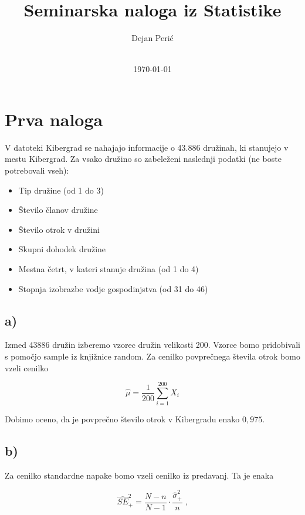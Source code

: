 \documentclass[12pt, a4paper]{article}
\title{Seminarska naloga iz Statistike}
\author{Dejan Perić \\~ \\ }
\date{\today}
\begin{document}

\maketitle




\section{Prva naloga}

V datoteki Kibergrad se nahajajo informacije o 43.886 družinah, 
ki stanujejo v mestu Kibergrad. Za vsako družino so zabeleženi 
naslednji podatki (ne boste potrebovali vseh):

\begin{itemize}
    \item Tip družine (od 1 do 3)
    \item Število članov družine
    \item Število otrok v družini
    \item Skupni dohodek družine
    \item Mestna četrt, v kateri stanuje družina (od 1 do 4)
    \item Stopnja izobrazbe vodje gospodinjstva (od 31 do 46)
\end{itemize}
    
\subsection{a)}

Izmed 43886 družin izberemo vzorec družin velikosti 200. Vzorce bomo pridobivali s pomočjo sample iz knjižnice random. Za cenilko povprečnega števila otrok bomo vzeli cenilko

$$\hat{\mu} = \frac{1}{200}\sum^{200}_{i=1} X_i $$

Dobimo oceno, da je povprečno število otrok v Kibergradu enako $0,975$.

\subsection{b)}

Za cenilko standardne napake bomo vzeli cenilko iz predavanj. Ta je enaka 

$$ \hat{SE}_+^2 = \frac{N-n}{N-1} \cdot \frac{\hat{\sigma}_+^2}{n} \text{ ,}$$
\end{document}
